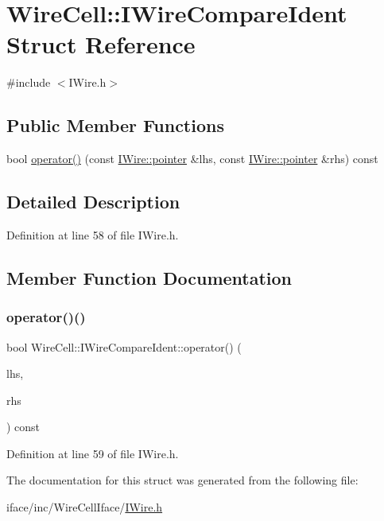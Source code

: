 \hypertarget{struct_wire_cell_1_1_i_wire_compare_ident}{}\section{Wire\+Cell\+:\+:I\+Wire\+Compare\+Ident Struct Reference}
\label{struct_wire_cell_1_1_i_wire_compare_ident}


{\ttfamily \#include $<$I\+Wire.\+h$>$}

\subsection*{Public Member Functions}
\begin{DoxyCompactItemize}
\item 
bool \hyperlink{struct_wire_cell_1_1_i_wire_compare_ident_a971afed3ef234b01bf47c2f454f69bc0}{operator()} (const \hyperlink{class_wire_cell_1_1_i_data_aff870b3ae8333cf9265941eef62498bc}{I\+Wire\+::pointer} \&lhs, const \hyperlink{class_wire_cell_1_1_i_data_aff870b3ae8333cf9265941eef62498bc}{I\+Wire\+::pointer} \&rhs) const
\end{DoxyCompactItemize}


\subsection{Detailed Description}


Definition at line 58 of file I\+Wire.\+h.



\subsection{Member Function Documentation}
\mbox{\label{struct_wire_cell_1_1_i_wire_compare_ident_a971afed3ef234b01bf47c2f454f69bc0}} 
\subsubsection{\texorpdfstring{operator()()}{operator()()}}
{\footnotesize\ttfamily bool Wire\+Cell\+::\+I\+Wire\+Compare\+Ident\+::operator() (\begin{DoxyParamCaption}\item[{const \hyperlink{class_wire_cell_1_1_i_data_aff870b3ae8333cf9265941eef62498bc}{I\+Wire\+::pointer} \&}]{lhs,  }\item[{const \hyperlink{class_wire_cell_1_1_i_data_aff870b3ae8333cf9265941eef62498bc}{I\+Wire\+::pointer} \&}]{rhs }\end{DoxyParamCaption}) const\hspace{0.3cm}{\ttfamily [inline]}}



Definition at line 59 of file I\+Wire.\+h.



The documentation for this struct was generated from the following file\+:\begin{DoxyCompactItemize}
\item 
iface/inc/\+Wire\+Cell\+Iface/\hyperlink{_i_wire_8h}{I\+Wire.\+h}\end{DoxyCompactItemize}
